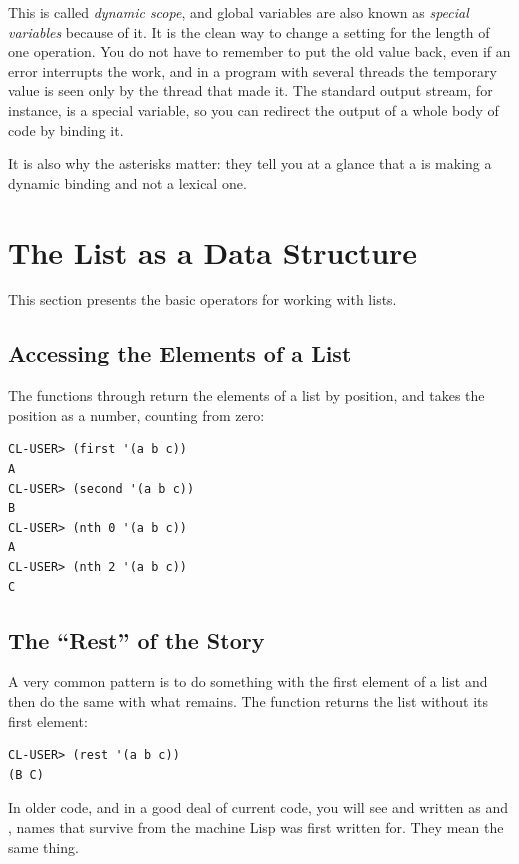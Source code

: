 This is called \emph{dynamic scope}, and global variables are also
known as \emph{special variables} because of it. It is the clean way
to change a setting for the length of one operation. You do not have
to remember to put the old value back, even if an error interrupts the
work, and in a program with several threads the temporary value is
seen only by the thread that made it. The standard output stream, for
instance, is a special variable, so you can redirect the output of a
whole body of code by binding it.

It is also why the asterisks matter: they tell you at a glance that a
 is making a dynamic binding and not a lexical one.

\section{The List as a Data Structure}

This section presents the basic operators for working with lists.

\subsection{Accessing the Elements of a List}

The functions  through  return the elements
of a list by position, and  takes the position as a number,
counting from zero:

\begin{verbatim}
CL-USER> (first '(a b c))
A
CL-USER> (second '(a b c))
B
CL-USER> (nth 0 '(a b c))
A
CL-USER> (nth 2 '(a b c))
C
\end{verbatim}

\subsection{The ``Rest'' of the Story}

A very common pattern is to do something with the first element of a
list and then do the same with what remains. The function
 returns the list without its first element:

\begin{verbatim}
CL-USER> (rest '(a b c))
(B C)
\end{verbatim}

In older code, and in a good deal of current code, you will see
 and  written as  and ,
names that survive from the machine Lisp was first written for. They
mean the same thing.

